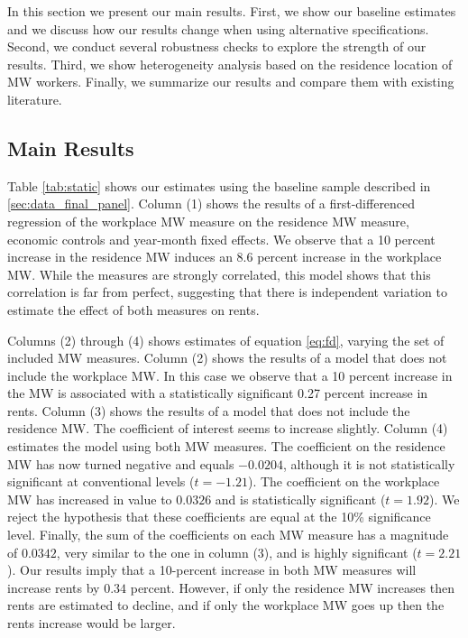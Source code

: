 
In this section we present our main results.
First, we show our baseline estimates and we discuss how our results change
when using alternative specifications.
Second, we conduct several robustness checks to explore the strength of 
our results.
Third, we show heterogeneity analysis based on the residence location of MW 
workers.
Finally, we summarize our results and compare them with existing literature.

\subsection{Main Results}\label{sec:main_results}

Table \ref{tab:static} shows our estimates using the baseline sample
described in \ref{sec:data_final_panel}.
Column (1) shows the results of a first-differenced regression of the workplace
MW measure on the residence MW measure, economic controls and year-month fixed
effects.
We observe that a 10 percent increase in the residence MW induces an 
8.6 percent increase in the workplace MW.
While the measures are strongly correlated, this model shows that this 
correlation is far from perfect, suggesting that there is independent variation
to estimate the effect of both measures on rents.

Columns (2) through (4) shows estimates of equation \ref{eq:fd}, varying the
set of included MW measures.
Column (2) shows the results of a model that does not include the workplace MW.
In this case we observe that a 10 percent increase in the MW is associated with
a statistically significant 0.27 percent increase in rents.
Column (3) shows the results of a model that does not include the residence MW.
The coefficient of interest seems to increase slightly.
Column (4) estimates the model using both MW measures.
The coefficient on the residence MW has now turned negative and equals $-0.0204$, 
although it is not statistically significant at conventional levels ($t=-1.21$).
The coefficient on the workplace MW has increased in value to $0.0326$ and is 
statistically significant ($t=1.92$).
We reject the hypothesis that these coefficients are equal at the 10\% 
significance level.
Finally, the sum of the coefficients on each MW measure has a magnitude of 
$0.0342$, very similar to the one in column (3), and is highly significant 
($t=2.21$).
Our results imply that a 10-percent increase in both MW measures will increase
rents by $0.34$ percent.
However, if only the residence MW increases then rents are estimated to decline,
and if only the workplace MW goes up then the rents increase would be larger.

